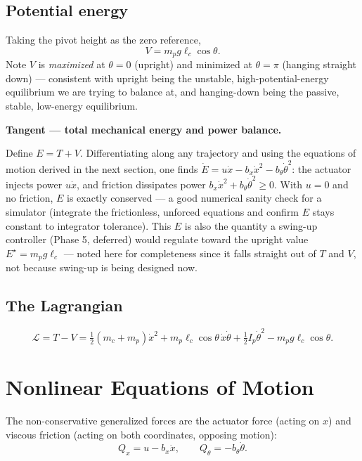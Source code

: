\documentclass[11pt]{article}
\newenvironment{tangent}[1]{%
  \par\smallskip\noindent\hrulefill\par
  \noindent\textbf{Tangent — #1.}\par\smallskip
  \begingroup\itshape
}{%
  \endgroup
  \par\noindent\hrulefill\par\smallskip
}
\begin{document}
\subsection{Potential energy}
Taking the pivot height as the zero reference,
\begin{equation}
  V = m_p g \ell_c\cos\theta. \label{eq:potential}
\end{equation}
Note $V$ is \emph{maximized} at $\theta=0$ (upright) and minimized at
$\theta=\pi$ (hanging straight down) — consistent with upright being the
unstable, high-potential-energy equilibrium we are trying to balance at,
and hanging-down being the passive, stable, low-energy equilibrium.

\begin{tangent}{total mechanical energy and power balance}
Define $E = T+V$. Differentiating along any trajectory and using the
equations of motion derived in the next section, one finds
$\dot E = u\dot x - b_x\dot x^2 - b_\theta\dot\theta^2$: the actuator
injects power $u\dot x$, and friction dissipates power
$b_x\dot x^2+b_\theta\dot\theta^2 \ge 0$. With $u=0$ and no friction,
$E$ is exactly conserved — a good numerical sanity check for a simulator
(integrate the frictionless, unforced equations and confirm $E$ stays
constant to integrator tolerance). This $E$ is also the quantity a
swing-up controller (Phase 5, deferred) would regulate toward the upright
value $E^\star = m_p g\ell_c$ — noted here for completeness since it falls
straight out of $T$ and $V$, not because swing-up is being designed now.
\end{tangent}

\subsection{The Lagrangian}
\begin{equation}
  \mathcal L = T - V = \tfrac12(m_c+m_p)\dot x^2 + m_p\ell_c\cos\theta\,
  \dot x\dot\theta + \tfrac12 I_p\dot\theta^2 - m_p g\ell_c\cos\theta.
  \label{eq:lagrangian}
\end{equation}

\section{Nonlinear Equations of Motion}

The non-conservative generalized forces are the actuator force (acting on
$x$) and viscous friction (acting on both coordinates, opposing motion):
\[
  Q_x = u - b_x\dot x, \qquad Q_\theta = -b_\theta\dot\theta.
\]
\end{document}
